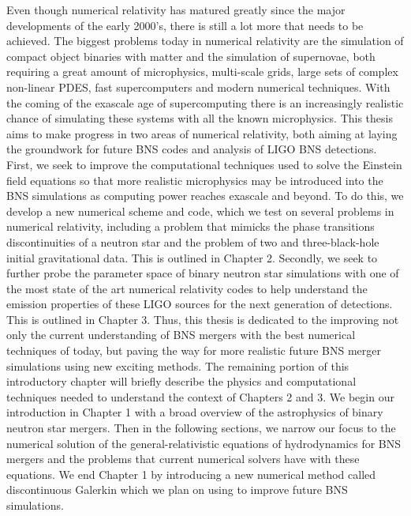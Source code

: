 Even though numerical relativity has matured greatly since the major developments of the early 2000's, there is still a lot more that needs to be achieved. The biggest problems today in numerical relativity are the simulation of compact object binaries with matter and the simulation of supernovae, both requiring a great amount of microphysics, multi-scale grids, large sets of complex non-linear PDES, fast supercomputers and modern numerical techniques. With the coming of the exascale age of supercomputing there is an increasingly realistic chance of simulating these systems with all the known microphysics. This thesis aims to make progress in two areas of numerical relativity, both aiming at laying the groundwork for future BNS codes and analysis of LIGO BNS detections. First, we seek to improve the computational techniques used to solve the Einstein field equations so that more realistic microphysics may be introduced into the BNS simulations as computing power reaches exascale and beyond. To do this, we develop a new numerical scheme and code, which we test on several problems in numerical relativity, including a problem that mimicks the phase transitions discontinuities of a neutron star and the problem of two and three-black-hole initial gravitational data. This is outlined in Chapter 2. Secondly, we seek to further probe the parameter space of binary neutron star simulations with one of the most state of the art numerical relativity codes to help understand the emission properties of these LIGO sources for the next generation of detections. This is outlined in Chapter 3. Thus, this thesis is dedicated to the improving not only the current understanding of BNS mergers with the best numerical techniques of today, but paving the way for more realistic future BNS merger simulations using new exciting methods. The remaining portion of this introductory chapter will briefly describe the physics and computational techniques needed to understand the context of Chapters 2 and 3.
We begin our introduction in Chapter 1 with a broad overview of the astrophysics of binary neutron star mergers. Then in the following sections, we narrow our focus to the numerical solution of the general-relativistic equations of hydrodynamics for BNS mergers and the problems that current numerical solvers have with these equations. We end Chapter 1 by introducing a new numerical method called discontinuous Galerkin which we plan on using to improve future BNS simulations.


